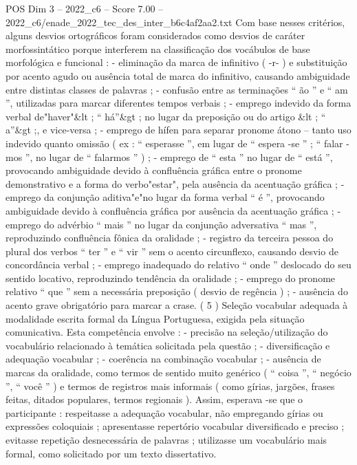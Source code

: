 \begin{textsample}{POS Dim 3 – 2022\_c6 – Score 7.00 – 2022\_c6/enade\_2022\_tec\_des\_inter\_b6c4af2aa2.txt}
Com base nesses critérios, alguns desvios ortográficos foram considerados como desvios de caráter morfossintático porque interferem na classificação dos vocábulos de base morfológica e funcional : - eliminação da marca de infinitivo ( -r- ) e substituição por acento agudo ou ausência total de marca do infinitivo, causando ambiguidade entre distintas classes de palavras ; - confusão entre as terminações “ ão ” e “ am ”, utilizadas para marcar diferentes tempos verbais ; - emprego indevido da forma verbal de"haver"\&lt ; “ há”\&gt ; no lugar da preposição ou do artigo \&lt ; “ a”\&gt ;, e vice-versa ; - emprego de hífen para separar pronome átono – tanto uso indevido quanto omissão ( ex : “ esperasse ”, em lugar de “ espera -se ” ; “ falar -mos ”, no lugar de “ falarmos ” ) ; - emprego de “ esta ” no lugar de “ está ”, provocando ambiguidade devido à confluência gráfica entre o pronome demonstrativo e a forma do verbo"estar", pela ausência da acentuação gráfica ; - emprego da conjunção aditiva"e"no lugar da forma verbal “ é ”, provocando ambiguidade devido à confluência gráfica por ausência da acentuação gráfica ; - emprego do advérbio “ mais ” no lugar da conjunção adversativa “ mas ”, reproduzindo confluência fônica da oralidade ; - registro da terceira pessoa do plural dos verbos “ ter ” e “ vir ” sem o acento circunflexo, causando desvio de concordância verbal ; - emprego inadequado do relativo “ onde ” deslocado do seu sentido locativo, reproduzindo tendência da oralidade ; - emprego do pronome relativo “ que ” sem a necessária preposição ( desvio de regência ) ; - ausência do acento grave obrigatório para marcar a crase. ( 5 ) Seleção vocabular adequada à modalidade escrita formal da Língua Portuguesa, exigida pela situação comunicativa.
Esta competência envolve : - precisão na seleção/utilização do vocabulário relacionado à temática solicitada pela questão ; - diversificação e adequação vocabular ; - coerência na combinação vocabular ; - ausência de marcas da oralidade, como termos de sentido muito genérico ( “ coisa ”, “ negócio ”, “ você ” ) e termos de registros mais informais ( como gírias, jargões, frases feitas, ditados populares, termos regionais ).
Assim, esperava -se que o participante : respeitasse a adequação vocabular, não empregando gírias ou expressões coloquiais ; apresentasse repertório vocabular diversificado e preciso ; evitasse repetição desnecessária de palavras ; utilizasse um vocabulário mais formal, como solicitado por um texto dissertativo.

\end{textsample}
